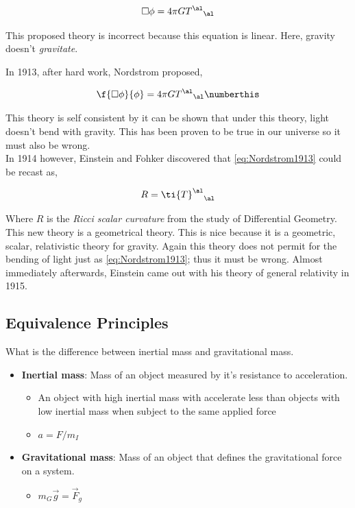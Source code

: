 \documentclass{article}
\begin{document}
\[ \Box \phi = 4 \pi G {T^{\al}}_{\al} \]

This proposed theory is incorrect because this equation is linear. Here, gravity doesn't \textit{gravitate}.

In 1913, after hard work, Nordstrom proposed,

\[ \f{\Box \phi}{\phi} = 4 \pi G {T^{\al}}_{\al} \numberthis \label{eq:Nordstrom1913}\]

This theory is self consistent by it can be shown that under this theory, light doesn't bend with gravity. This has been proven to be true in our universe so it must also be wrong. \\

In 1914 however, Einstein and Fohker discovered that \eqref{eq:Nordstrom1913} could be recast as,

\[ R = {\ti{T}^{\al}}_\al \]

Where $R$ is the \textit{Ricci scalar curvature} from the study of Differential Geometry. This new theory is a geometrical theory. This is nice because it is a geometric, scalar, relativistic theory for gravity. Again this theory does not permit for the bending of light just as \eqref{eq:Nordstrom1913}; thus it must be wrong. Almost immediately afterwards, Einstein came out with his theory of general relativity in 1915.

\subsection{Equivalence Principles}

What is the difference between inertial mass and gravitational mass.

\begin{itemize}
    \item \textbf{Inertial mass}: Mass of an object measured by it's resistance to acceleration.
    \begin{itemize}
        \item An object with high inertial mass with accelerate less than objects with low inertial mass when subject to the same applied force
        \item $a = F / m_I$
    \end{itemize}
    \item \textbf{Gravitational mass}: Mass of an object that defines the gravitational force on a system.
    \begin{itemize}
        \item $m_G \vec{g} = \vec{F}_g$
    \end{itemize}
\end{itemize}
\end{document}
